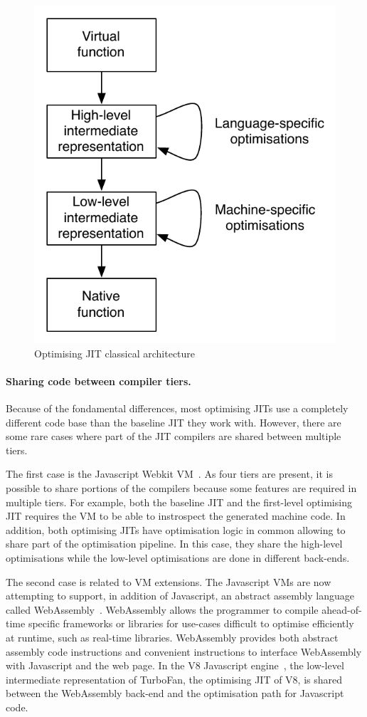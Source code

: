 \documentclass[a4paper,12pt,twoside]{../includes/ThesisStyle}
\begin{document}
\begin{figure}[h!]
    \begin{center}
        \includegraphics[width=0.49\linewidth]{OptJITFig}
        \caption{Optimising JIT classical architecture}
        \label{fig:OptJITFig}
    \end{center}
\end{figure}

\paragraph{Sharing code between compiler tiers.} Because of the fondamental differences, most optimising JITs use a completely different code base than the baseline JIT they work with. However, there are some rare cases where part of the JIT compilers are shared between multiple tiers. 

The first case is the Javascript Webkit VM~\cite{Webkit15}. As four tiers are present, it is possible to share portions of the compilers because some features are required in multiple tiers. For example, both the baseline JIT and the first-level optimising JIT requires the VM to be able to instrospect the generated machine code. In addition, both optimising JITs have optimisation logic in common allowing to share part of the optimisation pipeline. In this case, they share the high-level optimisations while the low-level optimisations are done in different back-ends.

The second case is related to VM extensions. The Javascript VMs are now attempting to support, in addition of Javascript, an abstract assembly language called WebAssembly~\cite{WebAssembly}. WebAssembly allows the programmer to compile ahead-of-time specific frameworks or libraries for use-cases difficult to optimise efficiently at runtime, such as real-time libraries. WebAssembly provides both abstract assembly code instructions and convenient instructions to interface WebAssembly with Javascript and the web page. In the V8 Javascript engine~\cite{V8}, the low-level intermediate representation of TurboFan, the optimising JIT of V8, is shared between the WebAssembly back-end and the optimisation path for Javascript code.
\end{document}

